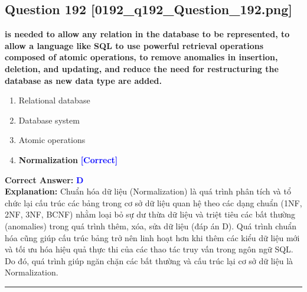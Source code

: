 \documentclass[11pt,a4paper]{article}
\begin{document}
\begin{minipage}{\textwidth}
\subsection*{Question 192 \quad \footnotesize{[0192\_q192\_Question\_192.png]}}
\noindent \textbf{is needed to allow any relation in the database to be represented, to allow a language like SQL to use powerful retrieval operations composed of atomic operations, to remove anomalies in insertion, deletion, and updating, and reduce the need for restructuring the database as new data type are added.}

\begin{enumerate}[label=\Alph*.]
    \item Relational database
    \item Database system
    \item Atomic operations
    \item \textbf{Normalization} \hfill \textcolor{blue}{\textbf{[Correct]}}
\end{enumerate}

\noindent \textbf{Correct Answer:} \textcolor{blue}{\textbf{D}} \\[2pt]
\noindent \textbf{Explanation:} Chuẩn hóa dữ liệu (Normalization) là quá trình phân tích và tổ chức lại cấu trúc các bảng trong cơ sở dữ liệu quan hệ theo các dạng chuẩn (1NF, 2NF, 3NF, BCNF) nhằm loại bỏ sự dư thừa dữ liệu và triệt tiêu các bất thường (anomalies) trong quá trình thêm, xóa, sửa dữ liệu (đáp án D). Quá trình chuẩn hóa cũng giúp cấu trúc bảng trở nên linh hoạt hơn khi thêm các kiểu dữ liệu mới và tối ưu hóa hiệu quả thực thi của các thao tác truy vấn trong ngôn ngữ SQL. Do đó, quá trình giúp ngăn chặn các bất thường và cấu trúc lại cơ sở dữ liệu là Normalization.

\par\vspace{0.3cm}
\hrule
\vspace{0.3cm}
\end{minipage}
\end{document}
